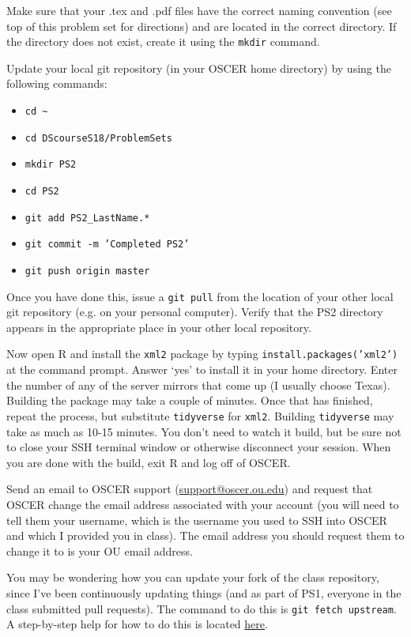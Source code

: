 \documentclass[12pt,english]{exam}
\begin{document}
\begin{questions}
\question Make sure that your .tex and .pdf files have the correct naming convention (see top of this problem set for directions) and are located in the correct directory. If the directory does not exist, create it using the \texttt{mkdir} command.

\question Update your local git repository (in your OSCER home directory) by using the following commands:
\begin{itemize}
	\item \texttt{cd \~}
	\item \texttt{cd DScourseS18/ProblemSets}
	\item \texttt{mkdir PS2}
	\item \texttt{cd PS2}
	\item \texttt{git add PS2\_LastName.*}
	\item \texttt{git commit -m 'Completed PS2'}
	\item \texttt{git push origin master}
\end{itemize}
Once you have done this, issue a \texttt{git pull} from the location of your other local git repository (e.g. on your personal computer). Verify that the PS2 directory appears in the appropriate place in your other local repository.

\question Now open R and install the \texttt{xml2} package by typing \texttt{install.packages('xml2')} at the command prompt. Answer `yes' to install it in your home directory. Enter the number of any of the server mirrors that come up (I usually choose Texas). Building the package may take a couple of minutes. Once that has finished, repeat the process, but substitute \texttt{tidyverse} for \texttt{xml2}. Building \texttt{tidyverse} may take as much as 10-15 minutes. You don't need to watch it build, but be sure not to close your SSH terminal window or otherwise disconnect your session. When you are done with the build, exit R and log off of OSCER.

\question Send an email to OSCER support (\href{mailto:support@oscer.ou.edu}{support@oscer.ou.edu}) and request that OSCER change the email address associated with your account (you will need to tell them your username, which is the username you used to SSH into OSCER and which I provided you in class). The email address you should request them to change it to is your OU email address.

\question You may be wondering how you can update your fork of the class repository, since I've been continuously updating things (and as part of PS1, everyone in the class submitted pull requests). The command to do this is \texttt{git fetch upstream}. A step-by-step help for how to do this is located \href{https://help.github.com/articles/syncing-a-fork/}{here}.

\end{questions}
\end{document}
